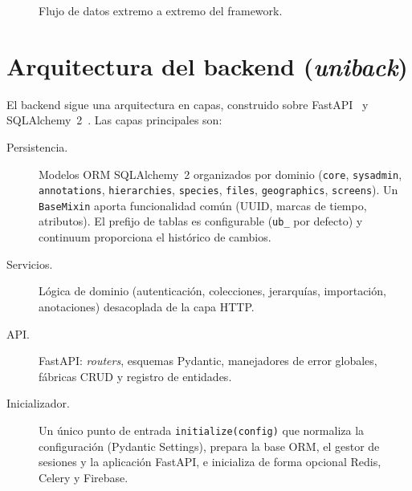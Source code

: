\begin{figure}[H]
\caption{Flujo de datos extremo a extremo del framework.}
\label{fig:arq}
\end{figure}

\section{Arquitectura del backend (\emph{uniback})}
El backend sigue una arquitectura en capas, construido sobre FastAPI~\cite{fastapi} y
SQLAlchemy~2~\cite{sqlalchemy}. Las capas principales son:

\begin{description}
  \item[Persistencia.] Modelos ORM SQLAlchemy~2 organizados por dominio
  (\texttt{core}, \texttt{sysadmin}, \texttt{annotations},
  \texttt{hierarchies}, \texttt{species}, \texttt{files},
  \texttt{geographics}, \texttt{screens}). Un \texttt{BaseMixin} aporta
  funcionalidad común (UUID, marcas de tiempo, atributos). El prefijo de
  tablas es configurable (\texttt{ub\_} por defecto) y \gls{continuum}
  proporciona el histórico de cambios.
  \item[Servicios.] Lógica de dominio (autenticación, colecciones,
  jerarquías, importación, anotaciones) desacoplada de la capa HTTP.
  \item[API.] FastAPI: \emph{routers}, esquemas Pydantic, manejadores de
  error globales, fábricas CRUD y registro de entidades.
  \item[Inicializador.] Un único punto de entrada \texttt{initialize(config)}
  que normaliza la configuración (Pydantic Settings), prepara la base ORM, el
  gestor de sesiones y la aplicación FastAPI, e inicializa de forma opcional
  Redis, Celery y Firebase.
\end{description}

